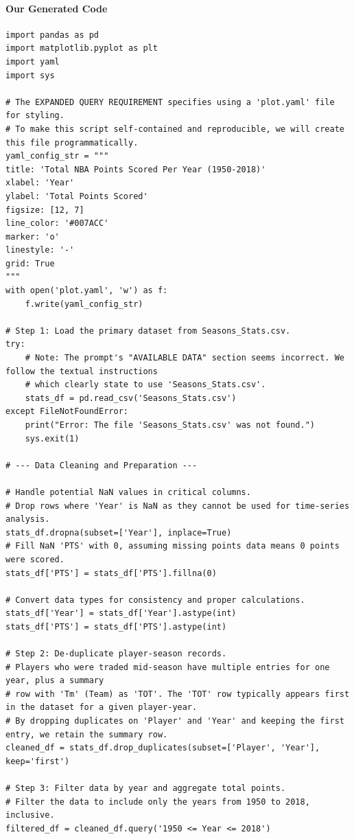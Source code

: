 \paragraph{Our Generated Code}
\begin{verbatim}
import pandas as pd
import matplotlib.pyplot as plt
import yaml
import sys

# The EXPANDED QUERY REQUIREMENT specifies using a 'plot.yaml' file for styling.
# To make this script self-contained and reproducible, we will create this file programmatically.
yaml_config_str = """
title: 'Total NBA Points Scored Per Year (1950-2018)'
xlabel: 'Year'
ylabel: 'Total Points Scored'
figsize: [12, 7]
line_color: '#007ACC'
marker: 'o'
linestyle: '-'
grid: True
"""
with open('plot.yaml', 'w') as f:
    f.write(yaml_config_str)

# Step 1: Load the primary dataset from Seasons_Stats.csv.
try:
    # Note: The prompt's "AVAILABLE DATA" section seems incorrect. We follow the textual instructions
    # which clearly state to use 'Seasons_Stats.csv'.
    stats_df = pd.read_csv('Seasons_Stats.csv')
except FileNotFoundError:
    print("Error: The file 'Seasons_Stats.csv' was not found.")
    sys.exit(1)

# --- Data Cleaning and Preparation ---

# Handle potential NaN values in critical columns.
# Drop rows where 'Year' is NaN as they cannot be used for time-series analysis.
stats_df.dropna(subset=['Year'], inplace=True)
# Fill NaN 'PTS' with 0, assuming missing points data means 0 points were scored.
stats_df['PTS'] = stats_df['PTS'].fillna(0)

# Convert data types for consistency and proper calculations.
stats_df['Year'] = stats_df['Year'].astype(int)
stats_df['PTS'] = stats_df['PTS'].astype(int)

# Step 2: De-duplicate player-season records.
# Players who were traded mid-season have multiple entries for one year, plus a summary
# row with 'Tm' (Team) as 'TOT'. The 'TOT' row typically appears first in the dataset for a given player-year.
# By dropping duplicates on 'Player' and 'Year' and keeping the first entry, we retain the summary row.
cleaned_df = stats_df.drop_duplicates(subset=['Player', 'Year'], keep='first')

# Step 3: Filter data by year and aggregate total points.
# Filter the data to include only the years from 1950 to 2018, inclusive.
filtered_df = cleaned_df.query('1950 <= Year <= 2018')


\end{verbatim}
